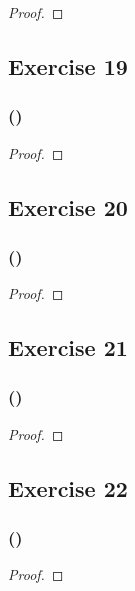 \documentclass[14pt]{extarticle}
\begin{document}
\begin{proof}

\end{proof}

\subsection{Exercise 19}

\subsubsection{()}

\begin{proof}

\end{proof}

\subsection{Exercise 20}

\subsubsection{()}

\begin{proof}

\end{proof}

\subsection{Exercise 21}

\subsubsection{()}

\begin{proof}

\end{proof}

\subsection{Exercise 22}

\subsubsection{()}

\begin{proof}

\end{proof}
\end{document}
